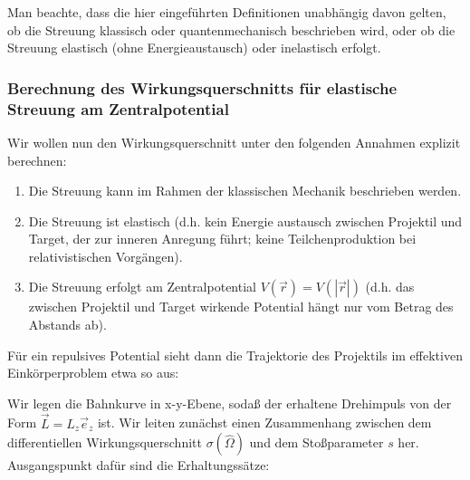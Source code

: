 \documentclass[10pt, letterpaper]{article}
\begin{document}
Man beachte, dass die hier eingeführten Definitionen unabhängig davon gelten, ob die Streuung klassisch oder quantenmechanisch beschrieben wird, oder ob die Streuung elastisch (ohne Energieaustausch) oder inelastisch erfolgt.

\subsubsection{Berechnung des Wirkungsquerschnitts für elastische Streuung am Zentralpotential}

Wir wollen nun den Wirkungsquerschnitt unter den folgenden Annahmen explizit berechnen:

\begin{enumerate}
\item Die Streuung kann im Rahmen der klassischen Mechanik beschrieben werden.
\item Die Streuung ist elastisch (d.h. kein Energie austausch zwischen Projektil und Target, der zur inneren Anregung führt; keine Teilchenproduktion bei relativistischen Vorgängen).
\item Die Streuung erfolgt am Zentralpotential $V(\vec{r})=V(|\vec{r}|)$ (d.h. das zwischen Projektil und Target wirkende Potential hängt nur vom Betrag des Abstands ab).
\end{enumerate}

Für ein repulsives Potential sieht dann die Trajektorie des Projektils im effektiven Einkörperproblem etwa so aus:

\begin{center}
\end{center}

Wir legen die Bahnkurve in x-y-Ebene, sodaß der erhaltene Drehimpuls von der Form $\vec{L}=L_z\vec{e}_z$ ist.
Wir leiten zunächst einen Zusammenhang zwischen dem differentiellen Wirkungsquerschnitt $\sigma(\hat{\Omega})$ und dem Stoßparameter $s$ her. Ausgangspunkt dafür sind die Erhaltungssätze:
\end{document}
